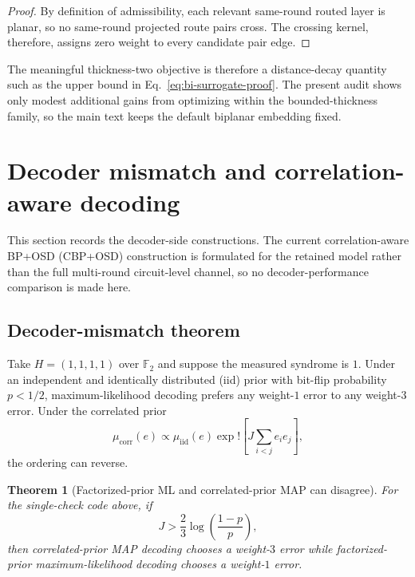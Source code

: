 \documentclass[
aps,
prx,
10pt,
twocolumn,
groupedaddress,
longbibliography,
nofootinbib,
floatfix
]{revtex4-2}
\newtheorem{theorem}{Theorem}
\theoremstyle{definition}
\newcommand{\F}{\mathbb{F}_2}
\begin{document}
\begin{proof}
By definition of admissibility, each relevant same-round routed layer is planar, so no same-round projected route pairs cross. The crossing kernel, therefore, assigns zero weight to every candidate pair edge.
\end{proof}

The meaningful thickness-two objective is therefore a distance-decay quantity such as the upper bound in Eq.~\eqref{eq:bi-surrogate-proof}. The present audit shows only modest additional gains from optimizing within the bounded-thickness family, so the main text keeps the default biplanar embedding fixed.

\section{Decoder mismatch and correlation-aware decoding}
\label{app:decoder}

This section records the decoder-side constructions. The current correlation-aware BP+OSD (CBP+OSD) construction is formulated for the retained model rather than the full multi-round circuit-level channel, so no decoder-performance comparison is made here.

\subsection{Decoder-mismatch theorem}

Take $H=(1,1,1,1)$ over $\F$ and suppose the measured syndrome is $1$. Under an independent and identically distributed (iid) prior with bit-flip probability $p<1/2$, maximum-likelihood decoding prefers any weight-$1$ error to any weight-$3$ error. Under the correlated prior
\begin{equation}
\mu_{\mathrm{corr}}(e)\propto \mu_{\mathrm{iid}}(e)\exp!\left[J\sum_{i<j}e_i e_j\right],
\end{equation}
the ordering can reverse.

\begin{theorem}[Factorized-prior ML and correlated-prior MAP can disagree]
\label{thm:mismatch}
For the single-check code above, if
\begin{equation}
J>\frac{2}{3}\log\left(\frac{1-p}{p}\right),
\end{equation}
then correlated-prior MAP decoding chooses a weight-$3$ error while factorized-prior maximum-likelihood decoding chooses a weight-$1$ error.
\end{theorem}
\end{document}
